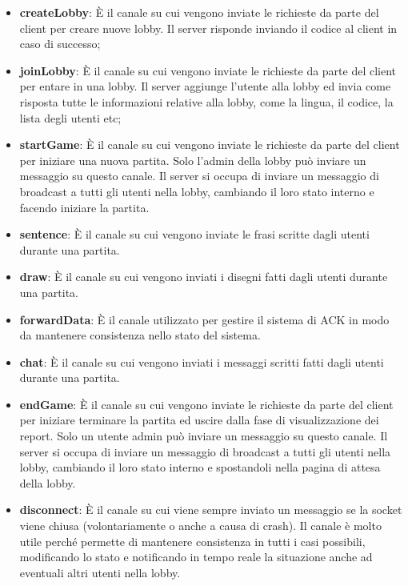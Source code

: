 \begin{itemize}
    \item \textbf{createLobby}: È il canale su cui vengono inviate le richieste da parte del client per creare nuove lobby. Il server risponde inviando il codice al client in caso di successo;
    \item \textbf{joinLobby}: È il canale su cui vengono inviate le richieste da parte del client per entare in una lobby. Il server aggiunge l'utente alla lobby ed invia come risposta tutte le informazioni relative alla lobby, come la lingua, il codice, la lista degli utenti etc;
    \item \textbf{startGame}: È il canale su cui vengono inviate le richieste da parte del client per iniziare una nuova partita. Solo l'admin della lobby può inviare un messaggio su questo canale. Il server si occupa di inviare un messaggio di broadcast a tutti gli utenti nella lobby, cambiando il loro stato interno e facendo iniziare la partita.
    \item \textbf{sentence}: È il canale su cui vengono inviate le frasi scritte dagli utenti durante una partita.
    \item \textbf{draw}: È il canale su cui vengono inviati i disegni fatti dagli utenti durante una partita.
    \item \textbf{forwardData}: È il canale utilizzato per gestire il sistema di ACK in modo da mantenere consistenza nello stato del sistema.
    \item \textbf{chat}: È il canale su cui vengono inviati i messaggi scritti fatti dagli utenti durante una partita.
    \item \textbf{endGame}: È il canale su cui vengono inviate le richieste da parte del client per iniziare terminare la partita ed uscire dalla fase di visualizzazione dei report. Solo un utente admin può inviare un messaggio su questo canale. Il server si occupa di inviare un messaggio di broadcast a tutti gli utenti nella lobby, cambiando il loro stato interno e spostandoli nella pagina di attesa della lobby.
    \item \textbf{disconnect}: È il canale su cui viene sempre inviato un messaggio se la socket viene chiusa (volontariamente o anche a causa di crash). Il canale è molto utile perché permette di mantenere consistenza in tutti i casi possibili, modificando lo stato e notificando in tempo reale la situazione anche ad eventuali altri utenti nella lobby.
\end{itemize}

